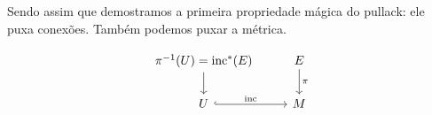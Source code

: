Sendo assim que demostramos a primeira propriedade mágica do pullack: ele puxa conexões. Também podemos puxar a métrica.

\begin{example}\leavevmode
\[\begin{tikzcd}
	\pi^{-1}(U)=\text{inc}^* (E)\arrow[d]&E\arrow[d,"\pi"]\\
	U\arrow[r,hook,"\text{inc}"]&M
\end{tikzcd}\]

\end{example}



\clearpage
